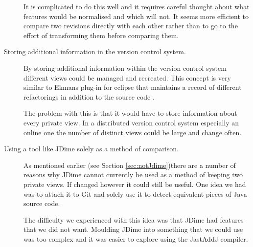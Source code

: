 \begin{description}
    It is complicated to do this well and it requires careful thought about what features would be normalised and which will not.
    It seems more efficient to compare two revisions directly with each other rather than to go to the effort of transforming them before comparing them. 
  \item [Storing additional information in the version control system.]
    By storing additional information within the version control system different views could be managed and recreated.
    This concept is very similar to Ekmans plug-in for eclipse that maintains a record of different refactorings in addition to the source code \cite{Ekman2004}.

    The problem with this is that it would have to store information about every private view.  In a distributed version control system especially an online one the number of distinct views could be large and change often.   
  
  \item [Using a tool like JDime solely as a method of comparison.]
    As mentioned earlier (see Section \ref{sec:notJdime})there are a number of reasons why JDime cannot currently be used as a method of keeping two private views. If changed however it could still be useful.  One idea we had was to attach it to Git and solely use it to detect equivalent pieces of Java source code.

    The difficulty we experienced with this idea was that JDime had features that we did not want.  Moulding JDime into something that we could use was too complex and it was easier to explore using the JastAddJ compiler. 
\end{description}

